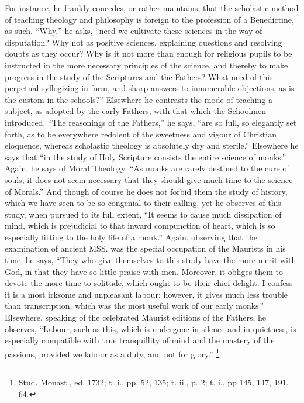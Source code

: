 For instance, he frankly concedes, or rather maintains, that the
scholastic method of teaching theology and philosophy is foreign to
the profession of a Benedictine, as such. ``Why,'' he asks,
``need we cultivate these sciences in the way of
disputation? Why not as positive sciences, explaining questions and
resolving doubts as they occur? Why is it not more than enough for
religious pupils to be instructed in the more necessary principles of
the science, and thereby to make progress in the study of the
Scriptures and the Fathers? What need of this perpetual syllogizing in
form, and sharp answers to innumerable objections, as is the custom in
the schools?'' Elsewhere he contrasts the mode of teaching a
subject, as adopted by the early Fathers, with that which the
Schoolmen introduced. ``The reasonings of the Fathers,'' he
says, ``are so full, so elegantly set forth, as to be everywhere
redolent of the sweetness and vigour of Christian eloquence, whereas
scholastic theology is absolutely dry and sterile.'' Elsewhere he
says that ``in the study of Holy Scripture consists the entire
science of monks.'' Again, he says of Moral Theology, ``As
monks are rarely destined to the cure of souls, it does not seem
necessary that they should give much time to the science of
Morals.'' And though of course he does not forbid them the study
of history, which we have seen to be so congenial to their calling,
yet he observes of this study, when pursued to its full extent,
``It seems to cause much dissipation of mind, which is prejudicial
to that inward compunction of heart, which is so especially fitting to
the holy life of a monk.'' Again, observing that the examination
of ancient MSS. was the special occupation of the Maurists in his
time, he says, ``They who give themselves to this study have the
more merit with God, in that they have so little praise with men.
Moreover, it obliges them to devote the more time to solitude, which
ought to be their chief delight. I confess it is a most irksome and
unpleasant labour; however, it gives much less trouble than
transcription, which was the most useful work of our early
monks.'' Elsewhere, speaking of the celebrated Maurist editions of
the Fathers, he observes, ``Labour, such as this, which is
undergone in silence and in quietness, is especially compatible with
true tranquillity of mind and the mastery of the passions, provided we
labour as a duty, and not for glory.'' \footnote{Stud. Monast.,
ed. 1732; t. i., pp. 52, 135; t. ii., p. 2; t. i., pp 145, 147, 191,
64.}

